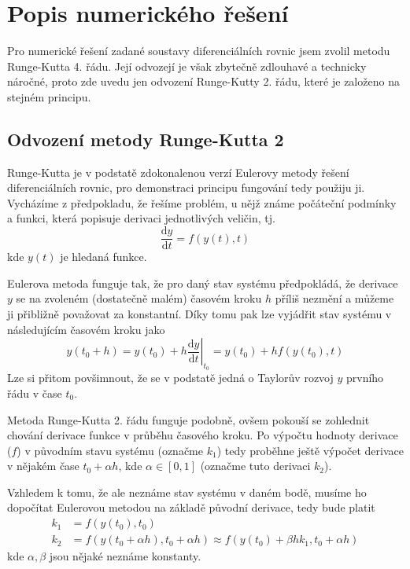 \documentclass[a4paper,11pt]{article}
\begin{document}
\section{Popis numerického řešení}

Pro numerické řešení zadané soustavy diferenciálních rovnic jsem zvolil metodu Runge-Kutta 4. řádu.
Její odvozejí je však zbytečně zdlouhavé a technicky náročné, proto zde uvedu
jen odvození Runge-Kutty 2. řádu, které je založeno na stejném principu.

\subsection{Odvození metody Runge-Kutta 2}

Runge-Kutta je v podstatě zdokonalenou verzí Eulerovy metody řešení diferenciálních rovnic,
pro demonstraci principu fungování tedy použiju ji. Vycházíme z předpokladu, že řešíme
problém, u nějž známe počáteční podmínky a funkci, která popisuje derivaci jednotlivých veličin, tj.
\begin{equation*}
    \frac{\mathrm{d} y}{\mathrm{d} t} = f(y(t), t)
\end{equation*}
kde $y(t)$ je hledaná funkce.

Eulerova metoda funguje tak, že pro daný stav systému předpokládá, že derivace $y$ se na zvoleném (dostatečně malém)
časovém kroku $h$ příliš nezmění a můžeme ji přibližně považovat za konstantní. Díky tomu
pak lze vyjádřit stav systému v následujícím časovém kroku jako
\begin{equation*}
    y(t_0 + h) = y(t_0) + h \left. \frac{\mathrm{d} y}{\mathrm{d} t} \right\rvert_{t_0} = y(t_0) + h f(y(t_0), t)
\end{equation*}
Lze si přitom povšimnout, že se v podstatě jedná o Taylorův rozvoj $y$ prvního řádu v čase $t_0$.

Metoda Runge-Kutta 2. řádu funguje podobně, ovšem pokouší se zohlednit chování derivace funkce 
v průběhu časového kroku. Po výpočtu hodnoty derivace ($f$) v původním stavu systému (označme $k_1$)
tedy proběhne ještě výpočet derivace v nějakém čase $t_0 + \alpha h$, kde $\alpha \in [0, 1]$ (označme 
tuto derivaci $k_2$).

Vzhledem k tomu, že ale neznáme stav systému v daném bodě, musíme ho dopočítat Eulerovou metodou na základě původní derivace, tedy
bude platit
\begin{align*}
    k_1 &= f(y(t_0), t_0) \\
    k_2 &= f(y(t_0 + \alpha h), t_0 + \alpha h) \approx f(y(t_0) + \beta h k_1, t_0 + \alpha h)
\end{align*}
kde $\alpha, \beta$ jsou nějaké neznáme konstanty.
\end{document}
